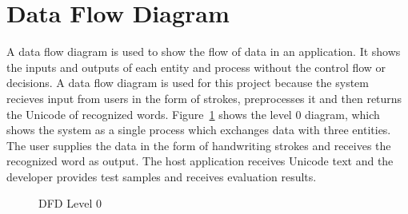 \documentclass[12pt,a4paper]{report}
\begin{document}
\section{Data Flow Diagram}
A data flow diagram is used to show the flow of data in an application. It shows the inputs and outputs of each entity and process without the control flow or decisions. A data flow diagram is used for this project because the system recieves input from users in the form of strokes, preprocesses it and then returns the Unicode of recognized words. Figure~\ref{fig:dfd0} shows the level 0 diagram, which shows the system as a single process which exchanges data with three entities. The user supplies the data in the form of handwriting strokes and receives the recognized word as output. The host application receives Unicode text and the developer provides test samples and receives evaluation results.

\begin{figure}[!ht]
\centering
{}
\caption{DFD Level 0}\label{fig:dfd0}
\end{figure}
\end{document}
